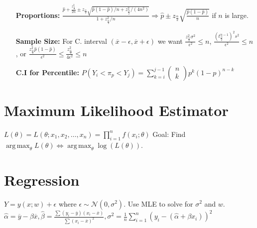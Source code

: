 \documentclass[10pt]{article}
\DeclareMathOperator*{\argmax}{arg\,max}
\begin{document}
\begin{enumerate}
            \item [\bf Proportions:] $\frac{\hat{p}+\frac{z_\frac{\alpha}{2}^2}{2n}\pm z_\frac{\alpha}{2}\sqrt{\hat{p}(1-\hat{p})/n+z_\frac{\alpha}{2}^2/(4n^2)}}{1+z_\frac{\alpha}{2}^2/n}\Rightarrow \hat{p}\pm z_\frac{\alpha}{2}\sqrt{\frac{\hat{p}(1-\hat{p})}{n}}$ if $n$ is large.
            \item [\bf Sample Size:] For C. interval $(\overline{x}-\epsilon,\overline{x}+\epsilon)$ we want $\frac{z_\frac{\alpha}{2}^2\sigma^2}{\epsilon^2}\le n$, $\frac{{(t^{n-1}_\frac{\alpha}{2})}^2s^2}{\epsilon^2}\le n$, or $\frac{z_\frac{\alpha}{2}^2\hat{p}(1-\hat{p})}{\epsilon^2}\le \frac{z_\frac{\alpha}{2}^2}{4\epsilon^2}\le n$
            \item [\bf C.I for Percentile:] $P(Y_i<\pi_p<Y_j)=\sum_{k=i}^{j-1}\begin{pmatrix}n\\k\end{pmatrix} p^k{(1-p)}^{n-k}$
        \end{enumerate}
\section{Maximum Likelihood Estimator}
$L(\theta)=L(\theta;x_1,x_2,\ldots,x_n)=\prod_{i=1}^{n}f(x_i;\theta)$ Goal: Find $\argmax_\theta L(\theta)\Leftrightarrow \argmax_\theta\log(L(\theta))$.
\section{Regression}
$Y=y(x;w)+\epsilon$ where $\epsilon\sim \mathcal{N}(0,\sigma^2)$. Use MLE to solve for $\sigma^2$ and $w$.\\
$\hat{\alpha}=\overline{y}-\beta\overline{x},\hat{\beta}=\frac{\sum(y_i-\overline{y})(x_i-\overline{x})}{\sum{(x_i-\overline{x})}^2},\sigma^2=\frac{1}{n}\sum_{i=1}^{n}{(y_i-(\hat{\alpha}+\beta x_i))}^2$
\end{document}
